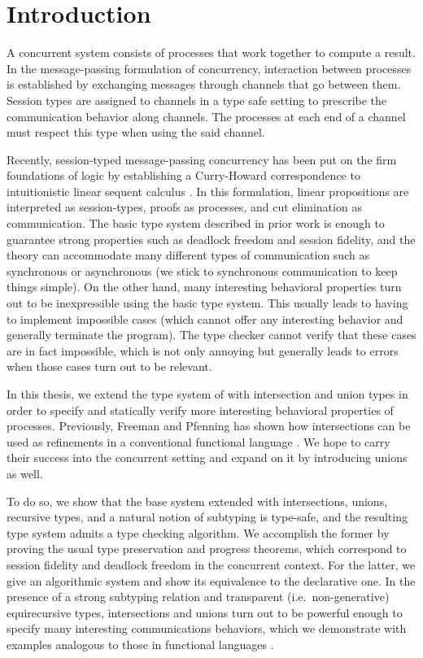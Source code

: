 
\chapter{Introduction}

A concurrent system consists of processes that work together to compute a result. In the message-passing formulation of concurrency, interaction between processes is established by exchanging messages through channels that go between them. Session types are assigned to channels in a type safe setting to prescribe the communication behavior along channels. The processes at each end of a channel must respect this type when using the said channel.

Recently, session-typed message-passing concurrency has been put on the firm foundations of logic by establishing a Curry-Howard correspondence to intuitionistic linear sequent calculus \cite{CairesP10, PfenningG15, Honda93}. In this formulation, linear propositions are interpreted as session-types, proofs as processes, and cut elimination as communication. The basic type system described in prior work is enough to guarantee strong properties such as deadlock freedom and session fidelity, and the theory can accommodate many different types of communication such as synchronous or asynchronous (we stick to synchronous communication to keep things simple). On the other hand, many interesting behavioral properties turn out to be inexpressible using the basic type system. This usually leads to having to implement impossible cases (which cannot offer any interesting behavior and generally terminate the program). The type checker cannot verify that these cases are in fact impossible, which is not only annoying but generally leads to errors when those cases turn out to be relevant.

In this thesis, we extend the type system of \cite{PfenningG15} with intersection and union types in order to specify and statically verify more interesting behavioral properties of processes. Previously, Freeman and Pfenning has shown how intersections can be used as refinements in a conventional functional language \cite{FreemanP91}. We hope to carry their success into the concurrent setting and expand on it by introducing unions as well.

To do so, we show that the base system extended with intersections, unions, recursive types, and a natural notion of subtyping is type-safe, and the resulting type system admits a type checking algorithm. We accomplish the former by proving the usual type preservation and progress theorems, which correspond to session fidelity and deadlock freedom in the concurrent context. For the latter, we give an algorithmic system and show its equivalence to the declarative one. In the presence of a strong subtyping relation and transparent (i.e.\ non-generative)  equirecursive types, intersections and unions turn out to be powerful enough to specify many interesting communications behaviors, which we demonstrate with examples analogous to those in functional languages \cite{FreemanP91,Dunfield03}.

